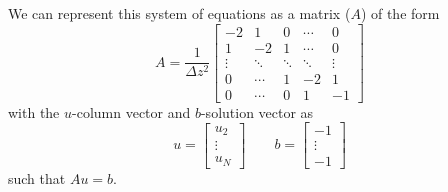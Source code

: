 \documentclass[11pt]{article}
\begin{document}
	We can represent this system of equations as a matrix ($ A $) of the form
	\begin{equation}
		A = \frac{1}{\Delta z^2}\begin{bmatrix}
		-2&1&0&\cdots&0\\
		1&-2&1&\cdots&0\\
		\vdots&\ddots&\ddots&\ddots&\vdots\\
		0&\cdots&1&-2&1\\
		0&\cdots&0&1&-1
		\end{bmatrix}
	\end{equation}
	with the $ u $-column vector and $ b $-solution vector as
	\begin{equation}
		u = \begin{bmatrix}
		u_2\\
		\vdots\\
		u_N
		\end{bmatrix} \qquad b = \begin{bmatrix}
		-1\\\vdots\\-1
		\end{bmatrix}
	\end{equation}
	such that $ Au = b $.
	
\end{document}
